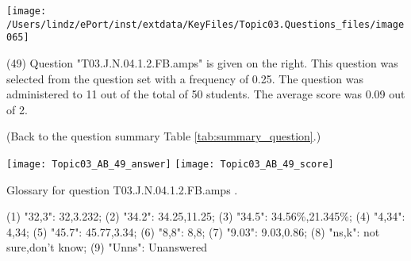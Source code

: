 \documentclass[12pt,english,nohyper]{tufte-handout}\usepackage[]{graphicx}\usepackage[]{color}
\begin{document}
\vspace{10cm}\begin{marginfigure}\texttt{[image: /Users/lindz/ePort/inst/extdata/KeyFiles/Topic03.Questions\_files/image065]}\end{marginfigure}\vspace{-10cm} (49) Question "T03.J.N.04.1.2.FB.amps" is given on the right. This question was selected from the question set with a frequency of 0.25. The question was administered to 11 out of the total of 50 students. The average score was 0.09 out of 2.

 (Back to the question summary Table \ref{tab:summary_question}.)

\begin{center} \texttt{[image: Topic03\_AB\_49\_answer]} \texttt{[image: Topic03\_AB\_49\_score]} \end{center} 

Glossary for question T03.J.N.04.1.2.FB.amps .

(1) "32,3": 32,3.232; (2) "34.2": 34.25,11.25; (3) "34.5": 34.56\%,21.345\%; (4) "4,34": 4,34; (5) "45.7": 45.77,3.34; (6) "8,8": 8,8; (7) "9.03": 9.03,0.86; (8) "ns,k": not sure,don't know; (9) "Unns": Unanswered
\end{document}
